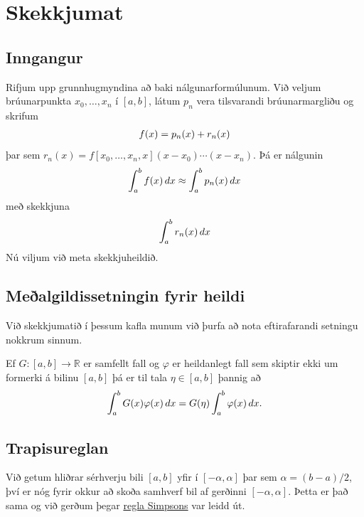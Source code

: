 \documentclass[letterpaper,10pt,icelandic]{sphinxmanual}
\begin{document}
\section{Skekkjumat}
\label{kafli05:skekkjumat}\label{kafli05:index-9}

\subsection{Inngangur}
\label{kafli05:id1}
Rifjum upp grunnhugmyndina að baki nálgunarformúlunum. Við veljum
brúunarpunkta \(x_0, \ldots, x_n\) í \([a,b]\), látum
\(p_n\) vera tilsvarandi brúunarmargliðu og skrifum
\begin{gather}
\begin{split}f(x) = p_n(x) + r_n(x)\end{split}\notag
\end{gather}
þar sem \(r_n(x) = f[x_0, \ldots , x_n, x](x-x_0) \cdots (x-x_n)\).
Þá er nálgunin
\begin{gather}
\begin{split}\int_a^b f(x)\,dx \approx \int_a^b p_n(x)\,dx\end{split}\notag
\end{gather}
með skekkjuna
\begin{gather}
\begin{split}\int_a^b r_n(x)\,dx\end{split}\notag
\end{gather}
Nú viljum við meta skekkjuheildið.


\subsection{Meðalgildissetningin fyrir heildi}
\label{kafli05:mealgildissetningin-fyrir-heildi}\label{kafli05:index-10}
Við skekkjumatið í þessum kafla munum við þurfa að nota eftirafarandi
setningu nokkrum sinnum.

Ef \(G:[a,b] \to {{\mathbb  R}}\) er samfellt fall og
\({\varphi}\) er heildanlegt fall sem skiptir ekki um formerki á
bilinu \([a,b]\) þá er til tala \(\eta \in [a,b]\) þannig að
\begin{gather}
\begin{split}\int_a^b G(x){\varphi}(x)\, dx = G(\eta) \int_a^b {\varphi}(x)\, dx.\end{split}\notag
\end{gather}

\subsection{Trapisureglan}
\label{kafli05:id2}
Við getum hliðrar sérhverju bili \([a,b]\) yfir í \([-\alpha,\alpha]\)
þar sem \(\alpha = (b-a)/2\), því er nóg fyrir okkur að skoða samhverf
bil af gerðinni \([-\alpha,\alpha]\). Þetta er það sama og við gerðum
þegar \href{https://notendur.hi.is/~bsm/stae405/kafli05.html\#regla-simpsons}{regla Simpsons}
var leidd út.
\end{document}
